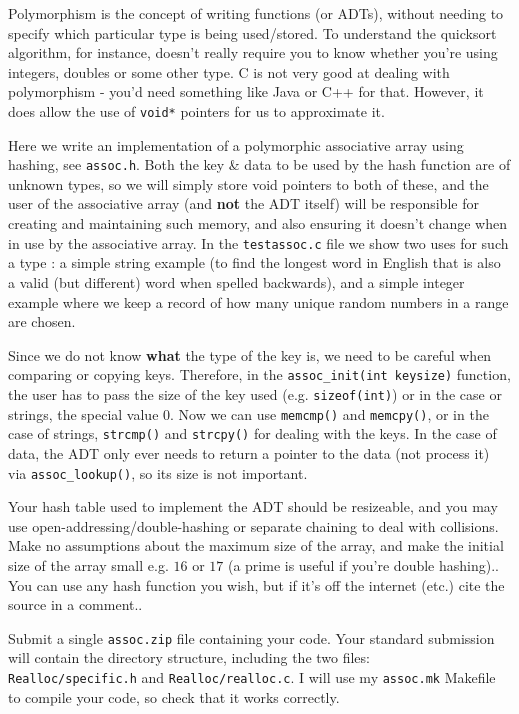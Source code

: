 
Polymorphism is the concept of writing functions (or ADTs), without
needing to specify which particular type is being used/stored. To
understand the quicksort algorithm, for instance, doesn't really require
you to know whether you're using integers, doubles or some other type. C
is not very good at dealing with polymorphism - you'd need something
like Java or C++ for that. However, it does allow the use of
\verb^void*^ pointers for us to approximate it.

\begin{exercise}
\label{ex:hahspoly}
Here we write an implementation of a polymorphic associative array using
hashing, see \verb^assoc.h^. Both the key \& data to be used by the hash
function are of
unknown types, so we will simply store void pointers to
both of these, and the user of the associative array (and {\bf not} the
ADT itself) will be responsible for creating and maintaining such memory,
and also ensuring it doesn't change when in use by the associative array.
In the \verb^testassoc.c^ file we show two uses for such a type :
a simple string example (to find the longest word in English that is
also a valid (but different) word when spelled backwards), and a simple
integer example where we keep a record of how many unique random numbers
in a range are chosen.

Since we do not know {\bf what} the type of the key is, we
need to be careful when comparing or copying keys. Therefore, in the
\verb^assoc_init(int keysize)^ function, the user has to pass the size of the
key used (e.g. \verb^sizeof(int)^) or in the case or strings, the special value $0$.
Now we can use \verb^memcmp()^ and \verb^memcpy()^, or in the case of strings, \verb^strcmp()^
and \verb^strcpy()^ for dealing with the keys. In the case of data, the ADT only ever needs
to return a pointer to the data (not process it) via
\verb^assoc_lookup()^, so its size is not important.

Your hash table used to implement the ADT should be resizeable, and you may use
open-addressing/double-hashing or separate chaining to deal with collisions. Make no assumptions about
the maximum size of the array, and make the initial size of the array small e.g. $16$ or $17$
(a prime is useful if you're double hashing)..
You can use any hash function you wish, but if it's off the internet (etc.) cite
the source in a comment..

Submit a single \verb^assoc.zip^ file containing your code.
Your standard submission will contain the directory structure, including the two files:\\
\verb^Realloc/specific.h^ and \verb^Realloc/realloc.c^.
I will use my \verb^assoc.mk^ Makefile to compile your code,
so check that it works correctly.
\end{exercise}

